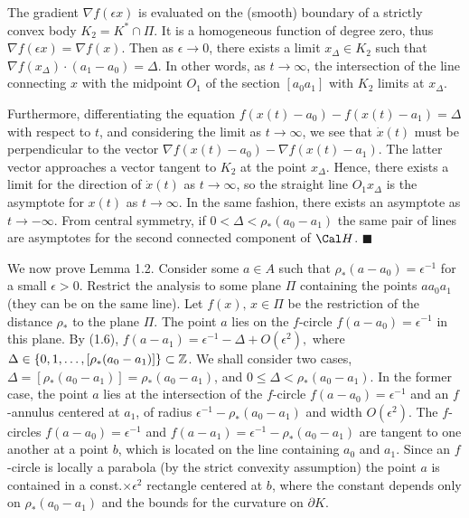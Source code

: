 The gradient $\nabla f(\epsilon x)$ is evaluated on the (smooth)
boundary of a strictly convex body $K_2=K^*\cap\Pi$. It is a
homogeneous function of degree zero, thus $\nabla f(\epsilon
x)=\nabla f(x)$. Then as $\epsilon\rightarrow0$, there exists a
limit $x_\Delta\in K_2$ such that $\nabla f(x_\Delta)\cdot
(a_1-a_0)=\Delta$. In other words, as $t\rightarrow\infty$, the
intersection of the line connecting $x$ with the midpoint $O_1$
of the section $[a_0a_1]$ with $K_2$ limits at $x_\Delta$.

Furthermore, differentiating the equation
$f(x(t)-a_0)-f(x(t)-a_1)=\Delta$ with respect to $t$, and
considering the limit as $t\rightarrow\infty$, we see that
$\dot{x}(t)$ must be perpendicular to the vector $\nabla
f(x(t)-a_0) - \nabla f(x(t)-a_1)$. The latter vector  approaches
a vector tangent to  $K_2$ at the point $x_\Delta$. Hence, there
exists a limit for the direction of $\dot{x}(t)$ as
$t\rightarrow\infty$, so the straight line $O_1x_\Delta$ is the
asymptote for $x(t)$ as $t\rightarrow\infty$. In the same
fashion, there exists an asymptote as $t\rightarrow -\infty$.
From central symmetry, if $0<\Delta<\rho_*(a_0-a_1)$ the same
pair of lines are asymptotes for the second connected component
of ${\Cal H}$. $\blacksquare$



We now prove Lemma 1.2. Consider some $a\in A$ such that
$\rho_*(a-a_0) = \epsilon^{-1}$ for a small $\epsilon>0$.
Restrict the analysis to some plane $\Pi$ containing the points
$aa_0a_1$ (they can be on the same line). Let $f(x), \,x\in \Pi$
be the restriction of the distance $\rho_*$ to the plane $\Pi$.
The point $a$ lies on the $f$-circle $f(a-a_0) = \epsilon^{-1}$
in this plane. By (1.6), $f(a-a_1) =
\epsilon^{-1}-\Delta+O(\epsilon^2),$ where
$\Delta\in\{0,1,\ldots,[\rho_*(a_0-a_1)]\} \subset{\Bbb Z}$. We
shall consider two cases, $\Delta=[\rho_*(a_0-a_1)]=
\rho_*(a_0-a_1)$, and $0 \leq \Delta <\rho_*(a_0-a_1)$. In the
former case, the point $a$ lies at the intersection of the
$f$-circle $f(a-a_0) = \epsilon^{-1}$ and an $f$-annulus
centered at $a_1$, of radius $\epsilon^{-1}-\rho_*(a_0-a_1)$ and
width $O(\epsilon^2)$. The $f$-circles $f(a-a_0) =
\epsilon^{-1}$ and $f(a-a_1) = \epsilon^{-1}-\rho_*(a_0-a_1)$
are tangent to one another at a point $b$, which is located on
the line containing $a_0$ and $a_1$. Since an $f$-circle is
locally a parabola (by the strict convexity assumption) the
point $a$ is contained in a  const.$\times\epsilon^2$ rectangle
centered at $b$, where the constant depends only on
$\rho_*(a_0-a_1)$ and the bounds for the curvature on $\partial
K$.

